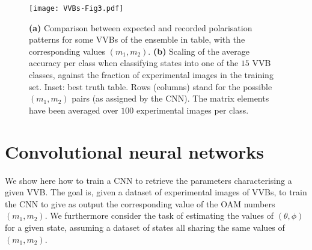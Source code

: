 \begin{figure}[tb]
    \centering
    \texttt{[image: VVBs-Fig3.pdf]}
    \caption{
	    \textbf{(a)} Comparison between expected and recorded polarisation patterns for some \acp{VVB} of the ensemble in table, with the corresponding values $(m_1,m_2)$.
	    \textbf{(b)} Scaling of the average accuracy per class when classifying states into one of the $15$ VVB classes,
	    against the fraction of experimental images in the training set. 
	    Inset: best truth table.
	    Rows (columns) stand for the possible $(m_1,m_2)$ pairs (as assigned by the CNN). The matrix elements have been averaged over $100$ experimental images per class.
    }%
    \label{fig:VVBs:resultsCNN}
\end{figure}



\section{Convolutional neural networks}
\label{sec:VVBs:CNNs}

We show here how to train a \ac{CNN} to retrieve the parameters characterising a given VVB.
The goal is, given a dataset of experimental images of VVBs, to train the CNN to give as output the corresponding value of the OAM numbers $(m_1,m_2)$.
We furthermore consider the task of estimating the values of $(\theta,\phi)$ for a given state, assuming a dataset of states all sharing the same values of $(m_1,m_2)$.

